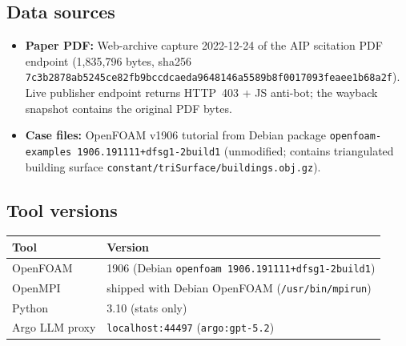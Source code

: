 \documentclass[11pt,a4paper]{article}
\begin{document}
\subsection{Data sources}
\begin{itemize}[nosep]
  \item \textbf{Paper PDF:} Web-archive capture 2022-12-24 of the AIP scitation
    PDF endpoint (1{,}835{,}796 bytes, sha256
    \texttt{7c3b2878ab5245ce82fb9bccdcaeda9648146a5589b8f0017093feaee1b68a2f}).
    Live publisher endpoint returns HTTP~403 + JS anti-bot; the wayback
    snapshot contains the original PDF bytes.
  \item \textbf{Case files:} OpenFOAM v1906 tutorial
    from Debian package \texttt{openfoam-examples\,1906.191111+dfsg1-2build1}
    (unmodified; contains triangulated building surface
    \texttt{constant/triSurface/buildings.obj.gz}).
\end{itemize}

\subsection{Tool versions}
\begin{center}\small
\begin{tabular}{@{}ll@{}}
\toprule
Tool & Version \\
\midrule
OpenFOAM & 1906 (Debian \texttt{openfoam 1906.191111+dfsg1-2build1}) \\
OpenMPI & shipped with Debian OpenFOAM (\texttt{/usr/bin/mpirun}) \\
Python & 3.10 (stats only) \\
Argo LLM proxy & \texttt{localhost:44497} (\texttt{argo:gpt-5.2}) \\
\bottomrule
\end{tabular}
\end{center}
\end{document}
